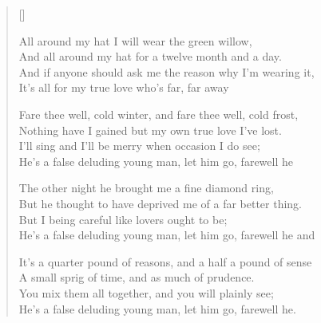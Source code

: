 \pagebreak
\settowidth{\versewidth}{And all around my hat for a twelve month and a day}
\begin{verse}[\versewidth]\\
\begin{chorus}
All around my hat I will wear the green willow,\\
And all around my hat for a twelve month and a day.\\
And if anyone should ask me the reason why I'm wearing it,\\
It's all for my true love who's far, far away
\end{chorus}

Fare thee well, cold winter, and fare thee well, cold frost,\\
Nothing have I gained but my own true love I've lost.\\
I'll sing and I'll be merry when occasion I do see;\\
He's a false deluding young man, let him go, farewell he



The other night he brought me a fine diamond ring,\\
But he thought to have deprived me of a far better thing.\\
But I being careful like lovers ought to be;\\
He's a false deluding young man, let him go, farewell he and

It's a quarter pound of reasons, and a half a pound of sense\\
A small sprig of time, and as much of prudence.\\
You mix them all together, and you will plainly see;\\
He's a false deluding young man, let him go, farewell he.

\end{verse}
